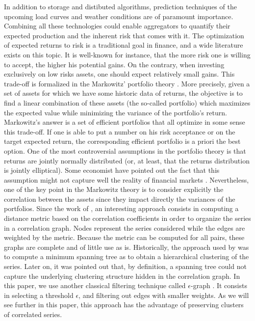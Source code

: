 \documentclass[journal]{IEEEtran}
\begin{document}
In addition to storage and distibuted algorithms, prediction techniques of the upcoming load curves and weather conditions are of paramount importance. Combining all these technologies could enable aggregators to quantify their expected production and the inherent risk that comes with it. The optimization of expected returns to risk is a traditional goal in finance, and a wide literature exists on this topic. It is well-known for instance, that the more risk one is willing to accept, the higher his potential gains. On the contrary, when investing exclusively on low risks assets, one should expect relatively small gains. This trade-off is formalized in the Markowitz' portfolio theory \cite{Markowitz1959}. More precisely, given a set of assets for which we have some historic data of returns, the objective is to find a linear combination of these assets (the so-called portfolio) which maximizes the expected value while minimizing the variance of the portfolio's return. Markowitz's answer is a set of efficient portfolios that all optimize in some sense this trade-off. If one is able to put a number on his risk acceptance or on the target expected return, the corresponding efficient portfolio is a priori the best option. One of the most controversial assumptions in the portfolio theory is that returns are jointly normally distributed (or, at least, that the returns distribution is jointly elliptical). Some economist have pointed out the fact that this assumption might not capture well the reality of financial markets \cite{doi:10.1142/S0219024912500197}. Nevertheless, one of the key point in the Markowitz theory is to consider explicitly the correlation between the assets since they impact directly the variances of the portfolios. Since the work of \cite{Mantegna1999}, an interesting approach consists in computing a distance metric based on the correlation coefficients in order to organize the series in a correlation graph. Nodes represent the series considered while the edges are weighted by the metric. Because the metric can be computed for all pairs, these graphs are complete and of little use as is. Historically, the approach used by \cite{Mantegna1999} was to compute a minimum spanning tree as to obtain a hierarchical clustering of the series. Later on, it was pointed out that, by definition, a spanning tree could not capture the underlying clustering structure hidden in the correlation graph. In this paper, we use another classical filtering technique called $ \epsilon $-graph \cite{Garas2008}. It consists in selecting a threshold $ \epsilon $, and filtering out edges with smaller weights. As we will see further in this paper, this approach has the advantage of preserving clusters of correlated series.
\end{document}
